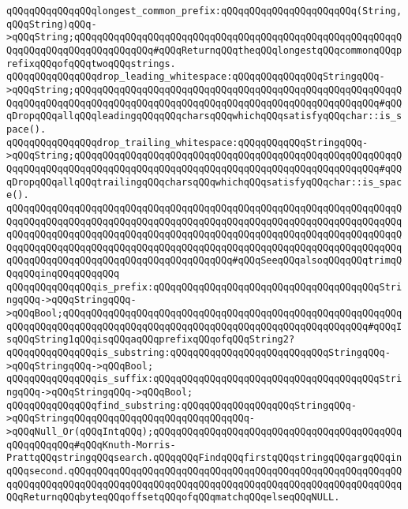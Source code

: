 \newline
\verb|qQQqqQQqqQQqqQQqlongest_common_prefix:qQQqqQQqqQQqqQQqqQQqqQQq(String,qQQqString)qQQq->qQQqString;qQQqqQQqqQQqqQQqqQQqqQQqqQQqqQQqqQQqqQQqqQQqqQQqqQQqqQQqqQQqqQQqqQQqqQQqqQQqqQQqqQQq#qQQqReturnqQQqtheqQQqlongestqQQqcommonqQQqprefixqQQqofqQQqtwoqQQqstrings.|\newline
\newline
\verb|qQQqqQQqqQQqqQQqdrop_leading_whitespace:qQQqqQQqqQQqqQQqStringqQQq->qQQqString;qQQqqQQqqQQqqQQqqQQqqQQqqQQqqQQqqQQqqQQqqQQqqQQqqQQqqQQqqQQqqQQqqQQqqQQqqQQqqQQqqQQqqQQqqQQqqQQqqQQqqQQqqQQqqQQqqQQqqQQqqQQq#qQQqDropqQQqallqQQqleadingqQQqqQQqcharsqQQqwhichqQQqsatisfyqQQqchar::is_space().|\newline
\verb|qQQqqQQqqQQqqQQqdrop_trailing_whitespace:qQQqqQQqqQQqStringqQQq->qQQqString;qQQqqQQqqQQqqQQqqQQqqQQqqQQqqQQqqQQqqQQqqQQqqQQqqQQqqQQqqQQqqQQqqQQqqQQqqQQqqQQqqQQqqQQqqQQqqQQqqQQqqQQqqQQqqQQqqQQqqQQqqQQq#qQQqDropqQQqallqQQqtrailingqQQqcharsqQQqwhichqQQqsatisfyqQQqchar::is_space().|\newline
\verb|qQQqqQQqqQQqqQQqqQQqqQQqqQQqqQQqqQQqqQQqqQQqqQQqqQQqqQQqqQQqqQQqqQQqqQQqqQQqqQQqqQQqqQQqqQQqqQQqqQQqqQQqqQQqqQQqqQQqqQQqqQQqqQQqqQQqqQQqqQQqqQQqqQQqqQQqqQQqqQQqqQQqqQQqqQQqqQQqqQQqqQQqqQQqqQQqqQQqqQQqqQQqqQQqqQQqqQQqqQQqqQQqqQQqqQQqqQQqqQQqqQQqqQQqqQQqqQQqqQQqqQQqqQQqqQQqqQQqqQQqqQQqqQQqqQQqqQQqqQQqqQQqqQQqqQQqqQQqqQQq#qQQqSeeqQQqalsoqQQqqQQqtrimqQQqqQQqinqQQqqQQqqQQq|\newline
\newline
\verb|qQQqqQQqqQQqqQQqis_prefix:qQQqqQQqqQQqqQQqqQQqqQQqqQQqqQQqqQQqqQQqStringqQQq->qQQqStringqQQq->qQQqBool;qQQqqQQqqQQqqQQqqQQqqQQqqQQqqQQqqQQqqQQqqQQqqQQqqQQqqQQqqQQqqQQqqQQqqQQqqQQqqQQqqQQqqQQqqQQqqQQqqQQqqQQqqQQqqQQqqQQqqQQqqQQq#qQQqIsqQQqString1qQQqisqQQqaqQQqprefixqQQqofqQQqString2?|\newline
\verb|qQQqqQQqqQQqqQQqis_substring:qQQqqQQqqQQqqQQqqQQqqQQqqQQqStringqQQq->qQQqStringqQQq->qQQqBool;|\newline
\verb|qQQqqQQqqQQqqQQqis_suffix:qQQqqQQqqQQqqQQqqQQqqQQqqQQqqQQqqQQqqQQqStringqQQq->qQQqStringqQQq->qQQqBool;|\newline
\newline
\verb|qQQqqQQqqQQqqQQqfind_substring:qQQqqQQqqQQqqQQqqQQqStringqQQq->qQQqStringqQQqqQQqqQQqqQQqqQQqqQQqqQQqqQQq->qQQqNull_Or(qQQqIntqQQq);qQQqqQQqqQQqqQQqqQQqqQQqqQQqqQQqqQQqqQQqqQQqqQQqqQQqqQQq#qQQqKnuth-Morris-PrattqQQqstringqQQqsearch.qQQqqQQqFindqQQqfirstqQQqstringqQQqargqQQqinqQQqsecond.qQQqqQQqqQQqqQQqqQQqqQQqqQQqqQQqqQQqqQQqqQQqqQQqqQQqqQQqqQQqqQQqqQQqqQQqqQQqqQQqqQQqqQQqqQQqqQQqqQQqqQQqqQQqqQQqqQQqqQQqqQQqqQQqqQQqReturnqQQqbyteqQQqoffsetqQQqofqQQqmatchqQQqelseqQQqNULL.|\newline
